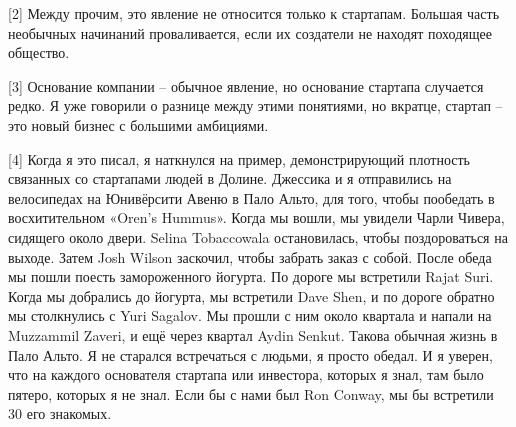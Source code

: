 \documentclass[ebook,12pt,oneside,openany]{memoir}
\begin{document}
[2] Между прочим, это явление не относится только к стартапам. Большая
часть необычных начинаний проваливается, если их создатели не находят
походящее общество.

[3] Основание компании – обычное явление, но основание стартапа
случается редко. Я уже говорили о разнице между этими понятиями, но
вкратце, стартап – это новый бизнес с большими амбициями.

[4] Когда я это писал, я наткнулся на пример, демонстрирующий
плотность связанных со стартапами людей в Долине. Джессика и я
отправились на велосипедах на Юнивёрсити Авеню в Пало Альто, для того,
чтобы пообедать в восхитительном «Oren's Hummus». Когда мы вошли, мы
увидели Чарли Чивера, сидящего около двери. Selina Tobaccowala
остановилась, чтобы поздороваться на выходе. Затем Josh Wilson
заскочил, чтобы забрать заказ с собой. После обеда мы пошли поесть
замороженного йогурта. По дороге мы встретили Rajat Suri. Когда мы
добрались до йогурта, мы встретили Dave Shen, и по дороге обратно мы
столкнулись с Yuri Sagalov. Мы прошли с ним около квартала и напали на
Muzzammil Zaveri, и ещё через квартал Aydin Senkut. Такова обычная
жизнь в Пало Альто. Я не старался встречаться с людьми, я просто
обедал. И я уверен, что на каждого основателя стартапа или инвестора,
которых я знал, там было пятеро, которых я не знал. Если бы с нами был
Ron Conway, мы бы встретили 30 его знакомых.
\end{document}
